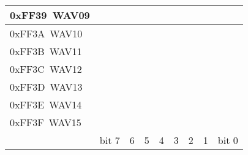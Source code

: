 \documentclass[\main/gbctr.tex]{subfiles}
\begin{document}
\begin{landscape}
\begin{table}
\begin{center}
\begin{tabularx}{\linewidth}{|l|C|C|C|C|C|C|C|C|}
      0xFF39~WAV09 & & & & & & & & \\
      \hline
      0xFF3A~WAV10 & & & & & & & & \\
      \hline
      0xFF3B~WAV11 & & & & & & & & \\
      \hline
      0xFF3C~WAV12 & & & & & & & & \\
      \hline
      0xFF3D~WAV13 & & & & & & & & \\
      \hline
      0xFF3E~WAV14 & & & & & & & & \\
      \hline
      0xFF3F~WAV15 & & & & & & & & \\
      \hline
      & bit 7 & 6 & 5 & 4 & 3 & 2 & 1 & bit 0 \\
      \hline
    \end{tabularx}{\parfillskip=0pt\par}
  \end{center}
\end{table}


\end{landscape}
\end{document}
